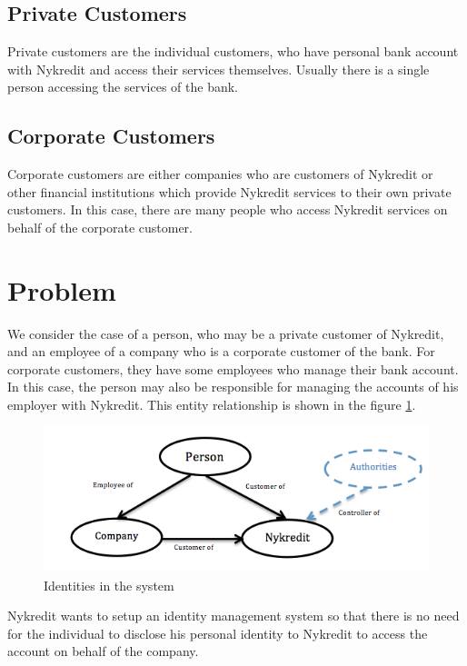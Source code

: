 \subsection{Private Customers}
Private customers are the individual customers, who have personal bank account with  Nykredit and access their services themselves. Usually there is a single person accessing the services of the bank.
\subsection{Corporate Customers}
Corporate customers are either companies who are customers of Nykredit or other financial institutions which provide Nykredit services to their own private customers. In this case, there are many people who access Nykredit services on behalf of the corporate customer.
\section{Problem}
We consider the case of a person, who may be a private customer of Nykredit, and an employee of a company who is a corporate customer of the bank. For corporate customers, they have some employees who manage their bank account. In this case, the person may also be responsible for managing the accounts of his employer with Nykredit. This entity relationship is shown in the figure \ref{fig:Customers}.
\begin{figure}[h]
	\centering
	\includegraphics[width=\textwidth]{figures/Customers}
	\caption{Identities in the system}
	\label{fig:Customers}
\end{figure}

Nykredit wants to setup an identity management system so that there is no need for the individual to disclose his personal identity to Nykredit to access the account on behalf of the company.

